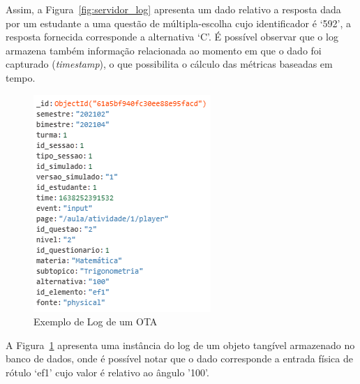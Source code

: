 Assim, a Figura~\ref{fig:servidor_log} apresenta um dado relativo a resposta dada por um estudante a uma questão de múltipla-escolha cujo identificador é `592', a resposta fornecida corresponde a alternativa `C'. É possível observar que o log armazena também informação relacionada ao momento em que o dado foi capturado (\textit{timestamp}), o que possibilita o cálculo das métricas baseadas em tempo.

\begin{figure}[htb!]
	\centering
	\includegraphics[width=0.4\linewidth]{chapters/proposedMethod/tools/servidor_log_tangivel.png}
	\caption{Exemplo de Log de um OTA}
	\label{fig:log_tangivel}
\end{figure}

A Figura~\ref{fig:log_tangivel} apresenta uma instância do log de um objeto tangível armazenado no banco de dados, onde é possível notar que o dado corresponde a entrada física de rótulo `ef1' cujo valor é relativo ao ângulo '100'.






